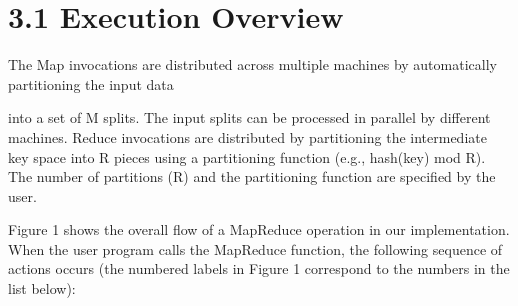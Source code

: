 \documentclass[
]{article}
\begin{document}
\section{3.1 Execution Overview}\label{execution-overview}

The Map invocations are distributed across multiple machines by
automatically partitioning the input data

into a set of M splits. The input splits can be processed in parallel by
different machines. Reduce invocations are distributed by partitioning
the intermediate key space into R pieces using a partitioning function
(e.g., hash(key) mod R). The number of partitions (R) and the
partitioning function are specified by the user.

Figure 1 shows the overall flow of a MapReduce operation in our
implementation. When the user program calls the MapReduce function, the
following sequence of actions occurs (the numbered labels in Figure 1
correspond to the numbers in the list below):
\end{document}
